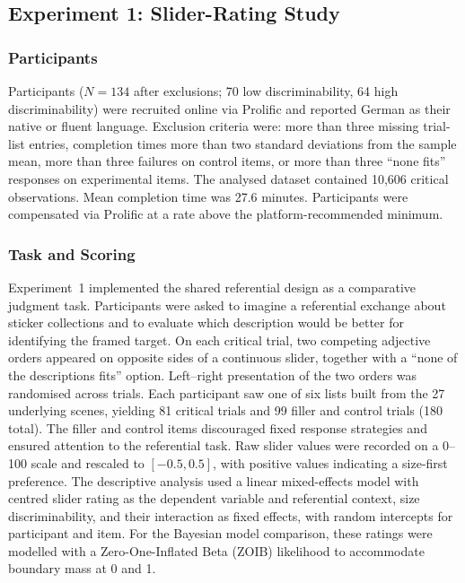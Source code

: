 \documentclass[man,floatsintext]{apa7}
\begin{document}
\subsection{Experiment 1: Slider-Rating Study}
\label{sec:exp:slider}

\subsubsection{Participants}

Participants ($N = 134$ after exclusions; 70 low discriminability, 64 high discriminability) were recruited online via Prolific and reported German as their native or fluent language.
Exclusion criteria were: more than three missing trial-list entries, completion times more than two standard deviations from the sample mean, more than three failures on control items, or more than three ``none fits'' responses on experimental items.
The analysed dataset contained 10{,}606 critical observations.
Mean completion time was 27.6 minutes.
Participants were compensated via Prolific at a rate above the platform-recommended minimum.

\subsubsection{Task and Scoring}

Experiment~1 implemented the shared referential design as a comparative judgment task.
Participants were asked to imagine a referential exchange about sticker collections and to evaluate which description would be better for identifying the framed target.
On each critical trial, two competing adjective orders appeared on opposite sides of a continuous slider, together with a ``none of the descriptions fits'' option.
Left--right presentation of the two orders was randomised across trials.
Each participant saw one of six lists built from the 27 underlying scenes, yielding 81 critical trials and 99 filler and control trials (180 total).
The filler and control items discouraged fixed response strategies and ensured attention to the referential task.
Raw slider values were recorded on a 0--100 scale and rescaled to $[-0.5, 0.5]$, with positive values indicating a size-first preference.
The descriptive analysis used a linear mixed-effects model with centred slider rating as the dependent variable and referential context, size discriminability, and their interaction as fixed effects, with random intercepts for participant and item.
For the Bayesian model comparison, these ratings were modelled with a Zero-One-Inflated Beta (ZOIB) likelihood to accommodate boundary mass at 0 and 1.
\end{document}
